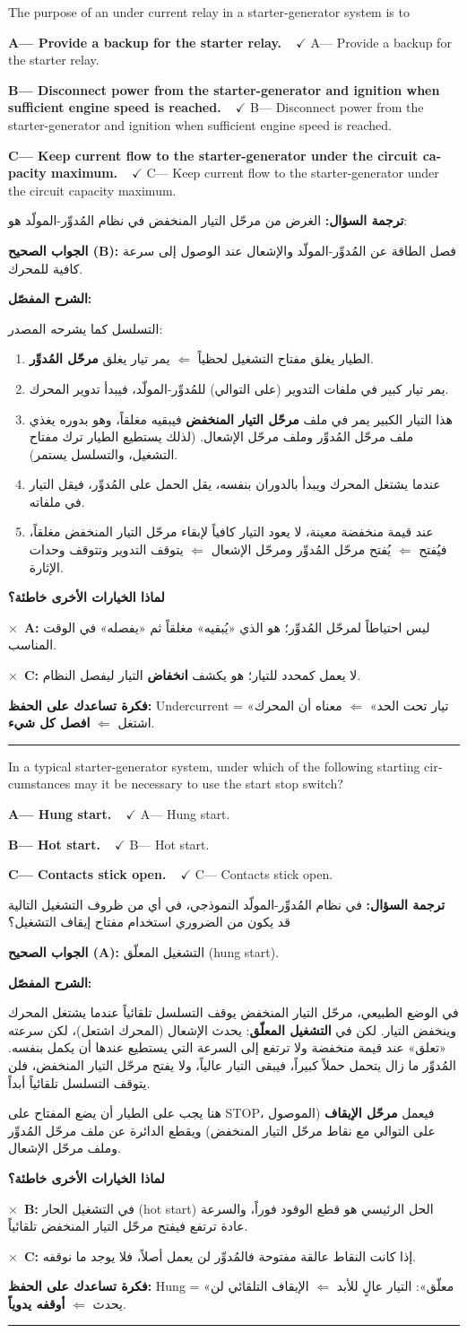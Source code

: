 \documentclass[11pt,a4paper]{article}
\newcommand{\en}[1]{\textenglish{#1}}
\newcommand{\correctletter}{}
\newcommand{\opt}[2]{%
  \ifdefstring{\correctletter}{#1}%
    {\textcolor{ansgreen}{\textbf{#1— #2\ \ $\checkmark$}}}%
    {#1— #2}\par}
\newcommand{\Q}[6]{%
  \renewcommand{\correctletter}{#6}%
  \par\bigskip
  \phantomsection\label{q#1}%
  \begin{tcolorbox}[enhanced,breakable,colback=qback,colframe=qframe,
      arc=2mm,boxrule=0.8pt,fonttitle=\bfseries,
      title={\en{Question #1}}]
    \begin{english}
      #2\par\smallskip
      \opt{A}{#3}\opt{B}{#4}\opt{C}{#5}
    \end{english}
  \end{tcolorbox}}
\newcommand{\tr}[1]{\textbf{\textcolor{qframe}{ترجمة السؤال:}} #1\par}
\newcommand{\ans}[2]{%
  \begin{tcolorbox}[colback=ansback,colframe=ansgreen,boxrule=0.6pt,arc=1.5mm,
      left=4pt,right=4pt,top=2pt,bottom=2pt]
    \textbf{\textcolor{ansgreen}{الجواب الصحيح (\en{#1}):}} #2
  \end{tcolorbox}}
\newcommand{\sharh}[1]{\textbf{\textcolor{conceptc}{الشرح المفصّل:}}\par #1\par}
\newcommand{\nohead}{\textbf{\textcolor{wrongc}{لماذا الخيارات الأخرى خاطئة؟}}\par}
\newcommand{\no}[2]{\hspace*{1em}\textcolor{wrongc}{$\times$}\ \textbf{\en{#1}:} #2\par}
\newcommand{\tip}[1]{%
  \begin{tcolorbox}[colback=tipback,colframe=tipframe,boxrule=0.5pt,arc=1.5mm,
      left=4pt,right=4pt,top=2pt,bottom=2pt]
    \textbf{فكرة تساعدك على الحفظ:} #1
  \end{tcolorbox}}
\newcommand{\qsep}{\par\medskip\noindent\textcolor{qframe!40}{\rule{\linewidth}{0.4pt}}\par}
\begin{document}
\Q{8619}{The purpose of an under current relay in a starter-generator system is to}
{Provide a backup for the starter relay.}
{Disconnect power from the starter-generator and ignition when sufficient engine speed is reached.}
{Keep current flow to the starter-generator under the circuit capacity maximum.}{B}
\tr{الغرض من مرحّل التيار المنخفض في نظام المُدوِّر-المولّد هو:}
\ans{B}{فصل الطاقة عن المُدوِّر-المولّد والإشعال عند الوصول إلى سرعة كافية للمحرك.}
\sharh{التسلسل كما يشرحه المصدر:
\begin{enumerate}[label=\arabic*.]
  \item الطيار يغلق مفتاح التشغيل لحظياً $\Leftarrow$ يمر تيار يغلق \textbf{مرحّل المُدوِّر}.
  \item يمر تيار كبير في ملفات التدوير (على التوالي) للمُدوِّر-المولّد، فيبدأ تدوير المحرك.
  \item هذا التيار الكبير يمر في ملف \textbf{مرحّل التيار المنخفض} فيبقيه مغلقاً، وهو بدوره يغذي ملف مرحّل المُدوِّر وملف مرحّل الإشعال. (لذلك يستطيع الطيار ترك مفتاح التشغيل، والتسلسل يستمر).
  \item عندما يشتغل المحرك ويبدأ بالدوران بنفسه، يقل الحمل على المُدوِّر، فيقل التيار في ملفاته.
  \item عند قيمة منخفضة معينة، لا يعود التيار كافياً لإبقاء مرحّل التيار المنخفض مغلقاً، فيُفتح $\Leftarrow$ يُفتح مرحّل المُدوِّر ومرحّل الإشعال $\Leftarrow$ يتوقف التدوير وتتوقف وحدات الإثارة.
\end{enumerate}}
\nohead
\no{A}{ليس احتياطاً لمرحّل المُدوِّر؛ هو الذي «يُبقيه» مغلقاً ثم «يفصله» في الوقت المناسب.}
\no{C}{لا يعمل كمحدد للتيار؛ هو يكشف \textbf{انخفاض} التيار ليفصل النظام.}
\tip{\en{Undercurrent} = «تيار تحت الحد» $\Leftarrow$ معناه أن المحرك اشتغل $\Leftarrow$ \textbf{افصل كل شيء}.}
\qsep

\Q{8620}{In a typical starter-generator system, under which of the following starting circumstances may it be necessary to use the start stop switch?}
{Hung start.}
{Hot start.}
{Contacts stick open.}{A}
\tr{في نظام المُدوِّر-المولّد النموذجي، في أي من ظروف التشغيل التالية قد يكون من الضروري استخدام مفتاح إيقاف التشغيل؟}
\ans{A}{التشغيل المعلّق (\en{hung start}).}
\sharh{في الوضع الطبيعي، مرحّل التيار المنخفض يوقف التسلسل تلقائياً عندما يشتغل المحرك وينخفض التيار. لكن في \textbf{التشغيل المعلّق}: يحدث الإشعال (المحرك اشتعل)، لكن سرعته «تعلق» عند قيمة منخفضة ولا ترتفع إلى السرعة التي يستطيع عندها أن يكمل بنفسه. المُدوِّر ما زال يتحمل حملاً كبيراً، فيبقى التيار عالياً، ولا يفتح مرحّل التيار المنخفض، فلن يتوقف التسلسل تلقائياً أبداً.

هنا يجب على الطيار أن يضع المفتاح على \en{STOP}، فيعمل \textbf{مرحّل الإيقاف} (الموصول على التوالي مع نقاط مرحّل التيار المنخفض) ويقطع الدائرة عن ملف مرحّل المُدوِّر وملف مرحّل الإشعال.}
\nohead
\no{B}{في التشغيل الحار (\en{hot start}) الحل الرئيسي هو قطع الوقود فوراً، والسرعة عادة ترتفع فيفتح مرحّل التيار المنخفض تلقائياً.}
\no{C}{إذا كانت النقاط عالقة مفتوحة فالمُدوِّر لن يعمل أصلاً، فلا يوجد ما نوقفه.}
\tip{\en{Hung} = «معلّق»: التيار عالٍ للأبد $\Leftarrow$ الإيقاف التلقائي لن يحدث $\Leftarrow$ \textbf{أوقفه يدوياً}.}
\qsep
\end{document}

